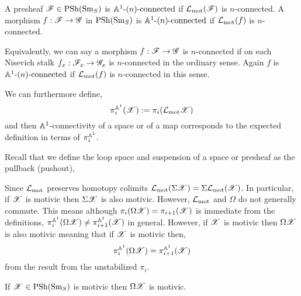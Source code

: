 \documentclass[12pt]{article}
\begin{document}
\begin{defn}
A presheaf $\mathscr{F} \in \mathrm{PSh}(\mathrm{Sm}_S)$ is $\mathbb{A}^1\text{-}(n)\text{-connected}$ if $\mathcal{L}_{\text{mot}}(\mathscr{F})$ is $n$-connected. A morphism $f : \mathscr{F} \to \mathscr{G}$ in $\mathrm{PSh}(\mathrm{Sm}_S)$ is $\mathbb{A}^1\text{-}(n)\text{-connected}$ if $\mathcal{L}_{\text{mot}}(f)$ is $n$-connected. 
\end{defn}

\begin{rmk}
Equivalently, we can say a morphism $f : \mathscr{F} \to \mathscr{G}$ is $n$-connected if on each Nisevich stalk $f_x : \mathscr{F}_x \to \mathscr{G}_x$ is $n$-connected in the ordinary sense. Again $f$ is $\mathbb{A}^1\text{-}(n)\text{-connected}$ if $\mathcal{L}_{\text{mot}}(f)$ is $n$-connected in this sense. 
\end{rmk}

\begin{rmk}
We can furthermore define,
\[ \pi_i^{\mathbb{A}^1}(\mathscr{X}) := \pi_i(\mathcal{L}_{\text{mot}} \mathscr{X}) \]
and then $\mathbb{A}^1$-connectivity of a space or of a map corresponds to the expected definition in terms of $\pi_i^{\mathbb{A}^1}$.
\end{rmk}

\begin{defn}
Recall that we define the loop space and suspension of a space or presheaf as the pullback (pushout),
\begin{center}
\quad \quad 
{}
\end{center}
\end{defn}

\begin{rmk}
Since $\mathcal{L}_{\text{mot}}$ preserves homotopy colimits $\mathcal{L}_{\text{mot}}(\Sigma \mathscr{X}) = \Sigma \mathcal{L}_{\text{mot}}(\mathscr{X})$. In particular, if $\mathscr{X}$ is motivic then $\Sigma \mathscr{X}$ is also motivic. However, $\mathcal{L}_{\text{mot}}$ and $\Omega$ do not generally commute. This means although $\pi_i(\Omega \mathscr{X}) = \pi_{i+1}(\mathscr{X})$ is immediate from the definitions, $\pi_i^{\mathbb{A}^1}(\Omega \mathscr{X}) \neq \pi_{i+1}^{\mathbb{A}^1}(\mathscr{X})$ in general. However, if $\mathscr{X}$ is motivic then $\Omega \mathscr{X}$ is also motivic meaning that if $\mathscr{X}$ is motivic then,
\[ \pi_i^{\mathbb{A}^1}(\Omega \mathscr{X}) = \pi_{i+1}^{\mathbb{A}^1}(\mathscr{X}) \]
from the result from the unstabilized $\pi_i$.
\end{rmk}

\begin{lemma}
If $\mathscr{X} \in \mathrm{PSh}(\mathrm{Sm}_S)$ is motivic then $\Omega \mathscr{X}$ is motivic.
\end{lemma}
\end{document}
